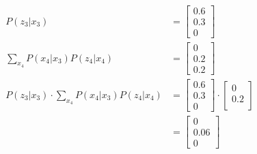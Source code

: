 \documentclass[answers]{exam}
\begin{document}
\begin{questions}
\begin{parts}
\begin{solution}
\begin{align*}
                P(z_3 | x_3)                                                                                    & = \begin{bmatrix}
                                                                                                                        0.6 \\
                                                                                                                        0.3 \\
                                                                                                                        0
                                                                                                                    \end{bmatrix}                                                                                                                                                                                                          \\                                          \sum_{x_4} P(x_4 | x_3) P(z_4 | x_4) & = \begin{bmatrix} 0 \\ 0.2 \\ 0.2 \end{bmatrix} \\
                P(z_3 | x_3) \cdot \sum_{x_4} P(x_4 | x_3) P(z_4 | x_4)                                         & = \begin{bmatrix}
                                                                                                                        0.6 \\
                                                                                                                        0.3 \\
                                                                                                                        0
                                                                                                                    \end{bmatrix} \cdot \begin{bmatrix} 0 \\ 0.2 \\ \end{bmatrix}                                                                                                                                                           \\ &= \begin{bmatrix} 0 \\ 0.06 \\ 0 \end{bmatrix} \\

\end{align*}
\end{solution}
\end{parts}
\end{questions}
\end{document}
